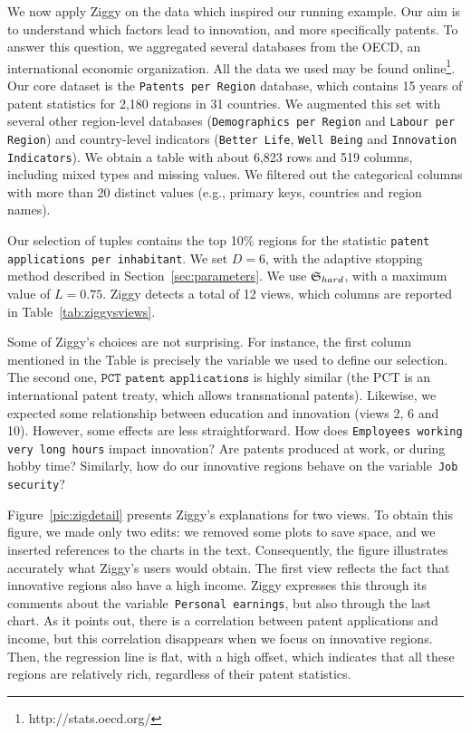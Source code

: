 We now apply Ziggy on the data which inspired our running example.
Our aim is to understand which factors lead to innovation, and more
specifically patents.  To answer this question, we aggregated several
databases from the OECD, an international economic organization. All the data
we used may be found online\footnote{http://stats.oecd.org/}. Our core dataset
is the \texttt{Patents per Region} database, which contains 15 years of patent
statistics for 2,180 regions in 31 countries. We augmented this set with
several other region-level databases (\texttt{Demo\-gra\-phics per Region} and
\texttt{Labour per Region}) and country-level indicators (\texttt{Better Life},
\texttt{Well Being} and \texttt{Innovation Indicators}).  We obtain a table
with about 6,823 rows and 519 columns, including mixed types and missing
values. We filtered out the categorical columns with more than 20 distinct
values (e.g., primary keys, countries and region names). 

Our selection of tuples contains the top 10\% regions for the statistic
\texttt{patent applications per inhabitant}. We set $D=6$, with the
adaptive stopping method described in Section~\ref{sec:parameters}. We use
$\mathfrak{S}_{hard}$, with a maximum value of $L=0.75$.  Ziggy detects a total of 12
views, which columns are reported in Table~\ref{tab:ziggysviews}.

Some of Ziggy's choices are not surprising. For instance, the first
column mentioned in the Table is precisely the variable we used to define our
selection. The second one, $\texttt{PCT patent applications}$ is highly similar
(the PCT is an international patent treaty, which allows transnational
pa\-tents). Likewise, we expected some relationship between education and
innovation (views 2, 6 and 10). However, some effects are less straightforward.
How does \texttt{Employees working very long\- hours} impact innovation? Are
patents produced at work, or during hobby time? Similarly, how do our
innovative regions behave on the variable~\texttt{Job security}?

Figure~\ref{pic:zigdetail} presents Ziggy's explanations for two views. To
obtain this figure, we made only two edits: we removed some plots to save
space, and we inserted references to the charts in the text. Consequently, the
figure illustrates accurately what Ziggy's users would obtain. The first view
reflects the fact that innovative regions also have a high income. Ziggy
expresses this through its comments about the
variable~\texttt{Personal earnings}, but also through the last chart. As it
points out, there is a correlation between patent applications and income, but
this correlation disappears when we focus on innovative regions. Then, the
regression line is flat, with a high offset, which indicates that all these
regions are relatively rich, regardless of their patent statistics.


